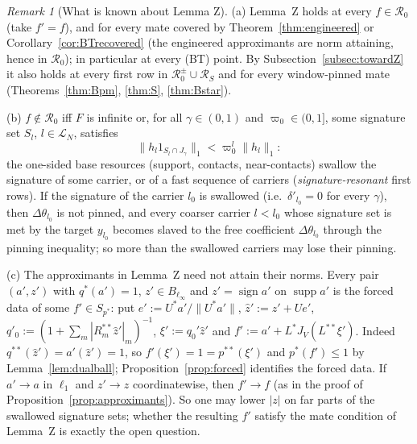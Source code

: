 \documentclass[10pt]{amsart}
\theoremstyle{definition}
\theoremstyle{remark}
\newtheorem{remark}[theorem]{Remark}
\newcommand{\supp}{\operatorname{supp}}
\newcommand{\sgn}{\operatorname{sign}}
\newcommand{\zh}{\hat z}
\begin{document}
\begin{remark}[What is known about Lemma Z]\label{rem:lemmaZ}
(a) Lemma~Z holds at every $f\in\mathcal R_0$ (take $f'=f$), and for every
mate covered by Theorem~\ref{thm:engineered} or
Corollary~\ref{cor:BTrecovered} (the engineered approximants are norm
attaining, hence in $\mathcal R_0$); in particular at every \textup{(BT)}
point.  By Subsection~\ref{subsec:towardZ} it also holds at every first
row in $\mathcal R_0^\pm\cup\mathcal R_S$ and for every window-pinned
mate (Theorems~\ref{thm:Bpm}, \ref{thm:S}, \ref{thm:Bstar}).

(b) $f\notin\mathcal R_0$ iff $F$ is infinite or, for all $\gamma\in(0,1)$
and $\varpi_0\in(0,1]$, some signature set $S_l$, $l\in\mathcal L_N$,
satisfies
\[
 \|h_l1_{S_l\cap J_\gamma}\|_1<\varpi_0^l\|h_l\|_1 :
\]
the one-sided base resources (support, contacts,
near-contacts) swallow the signature of some carrier, or of a fast sequence
of carriers (\emph{signature-resonant} first rows).  If the signature of the
carrier $l_0$ is swallowed (i.e.\ $\delta'_{l_0}=0$ for every
$\gamma$), then $\Delta\theta_{l_0}$ is not
pinned, and every coarser carrier $l<l_0$ whose signature set is met by the
target $y_{l_0}$ becomes slaved to the free coefficient $\Delta\theta_{l_0}$
through the pinning inequality; so more than the swallowed carriers may
lose their pinning.

(c) The approximants in Lemma~Z need not attain their norms.  Every pair
$(a',z')$ with $q^*(a')=1$, $z'\in B_{\ell_\infty}$ and $z'=\sgn a'$ on
$\supp a'$ is the forced data of some $f'\in S_{p^*}$: put
$e':=U^*a'/\|U^*a'\|$, $\zh':=z'+Ue'$, $q'_0:=(1+\sum_m|R^{**}_m\zh'|_m)^{-1}$,
$\xi':=q_0'\zh'$ and $f':=a'+L^*J_V(L^{**}\xi')$.  Indeed $q^{**}(\zh')=
a'(\zh')=1$, so $f'(\xi')=1=p^{**}(\xi')$ and $p^*(f')\le1$ by
Lemma~\ref{lem:dualball}; Proposition~\ref{prop:forced} identifies the
forced data.  If $a'\to a$ in $\ell_1$ and $z'\to z$ coordinatewise, then
$f'\to f$ (as in the proof of Proposition~\ref{prop:approximants}).  So one
may lower $|z|$ on far parts of the swallowed signature sets; whether the
resulting $f'$ satisfy the mate condition of Lemma~Z is exactly the open
question.


\end{remark}
\end{document}
